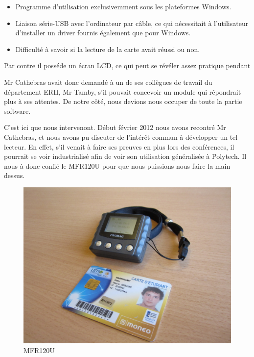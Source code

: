     \begin{itemize}
        \item Programme d'utilisation exclusivemment sous les plateformes Windows.
        \item Liaison série-USB avec l'ordinateur par câble, ce qui nécessitait 
              à l'utilisateur d'installer un driver fournis également que pour
              Windows.
        \item Difficulté à savoir si la lecture de la carte avait réussi ou non.
    \end{itemize}

Par contre il posséde un écran LCD, ce qui peut se révéler assez pratique pendant

Mr Cathebras avait donc demandé à un de ses collègues de travail du département
ERII, Mr Tamby, s'il pouvait concevoir un module qui répondrait plus à ses attentes.
De notre côté, nous devions nous occuper de toute la partie software.

C'est ici que nous intervenont. Début février 2012 nous avons recontré Mr Cathebras,
et nous avons pu discuter de l'intérêt commun à développer un tel lecteur. En effet,
s'il venait à faire ses preuves en plus lors des conférences, il pourrait se voir
industrialisé afin de voir son utilisation généralisée à Polytech. Il nous à donc
confié le MFR120U pour que nous puissions nous faire la main dessus.

    \begin{figure}[h]
        \begin{center}
            \includegraphics[scale=0.75]{images/mfr.jpg}
        \end{center}
        \caption{MFR120U}
        \label{MFR120U}
     \end{figure}  

